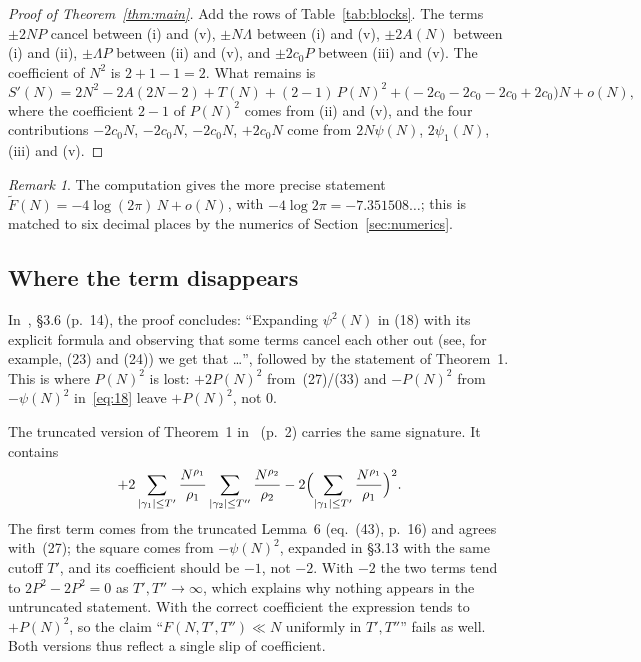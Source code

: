 \documentclass[11pt]{amsart}
\theoremstyle{definition}
\theoremstyle{remark}
\newtheorem{remark}[theorem]{Remark}
\numberwithin{equation}{section}
\newcommand{\Sp}{S'}
\newcommand{\Ft}{\widetilde F}
\newcommand{\Ca}{\cite{Ca}}
\begin{document}
\begin{proof}[Proof of Theorem~\ref{thm:main}]
Add the rows of Table~\ref{tab:blocks}. The terms $\pm2NP$ cancel between (i) and (v),
$\pm N\Lambda$ between (i) and (v), $\pm2A(N)$ between (i) and (ii), $\pm\Lambda P$
between (ii) and (v), and $\pm2c_0P$ between (iii) and (v). The coefficient of $N^2$ is
$2+1-1=2$. What remains is
\[
  \Sp(N)=2N^2-2A(2N-2)+T(N)+(2-1)\,P(N)^2+\bigl(-2c_0-2c_0-2c_0+2c_0\bigr)N+o(N),
\]
where the coefficient $2-1$ of $P(N)^2$ comes from (ii) and (v), and the four
contributions $-2c_0N$, $-2c_0N$, $-2c_0N$, $+2c_0N$ come from $2N\psi(N)$, $2\psi_1(N)$,
(iii) and (v).
\end{proof}

\begin{remark}\label{rem:constant}
The computation gives the more precise statement $\Ft(N)=-4\log(2\pi)\,N+o(N)$, with
$-4\log 2\pi=-7.351508\ldots$; this is matched to six decimal places by the numerics of
Section~\ref{sec:numerics}.
\end{remark}

\subsection{Where the term disappears}
In~\Ca{}, §3.6 (p.~14), the proof concludes: ``Expanding $\psi^2(N)$ in (18) with its
explicit formula and observing that some terms cancel each other out (see, for example,
(23) and (24)) we get that \dots'', followed by the statement of Theorem~1. This is where
$P(N)^2$ is lost: $+2P(N)^2$ from~(27)/(33) and $-P(N)^2$ from $-\psi(N)^2$
in~\eqref{eq:18} leave $+P(N)^2$, not $0$.

The truncated version of Theorem~1 in~\Ca{} (p.~2) carries the same signature. It
contains
\[
  +2\sum_{|\gamma_1|\le T'}\frac{N^{\rho_1}}{\rho_1}\sum_{|\gamma_2|\le T''}\frac{N^{\rho_2}}{\rho_2}
  -2\Bigl(\sum_{|\gamma_1|\le T'}\frac{N^{\rho_1}}{\rho_1}\Bigr)^2 .
\]
The first term comes from the truncated Lemma~6 (eq.~(43), p.~16) and agrees with~(27);
the square comes from $-\psi(N)^2$, expanded in §3.13 with the same cutoff $T'$, and its
coefficient should be $-1$, not $-2$. With $-2$ the two terms tend to $2P^2-2P^2=0$ as
$T',T''\to\infty$, which explains why nothing appears in the untruncated statement. With
the correct coefficient the expression tends to $+P(N)^2$, so the claim
``$F(N,T',T'')\ll N$ uniformly in $T',T''$'' fails as well. Both versions thus reflect a
single slip of coefficient.
\end{document}
